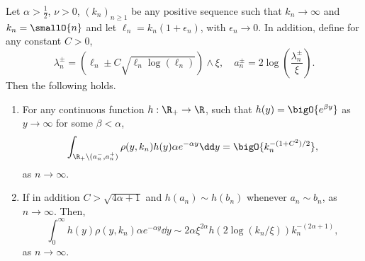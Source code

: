 \begin{lemma}\label{lem:concentration_argument}
Let $\alpha > \frac{1}{2}$, $\nu > 0$, $(k_n)_{n \ge 1}$ be any positive sequence such that $k_n \to \infty$ and $k_n = \smallO{n}$ and let $\ell_n = k_n(1 + \epsilon_n)$, with $\epsilon_n \to 0$. In addition, define for any constant $C > 0$,
\[
	\lambda_n^\pm = (\ell_n \pm C \sqrt{\ell_n \log(\ell_n)}) \wedge \xi, 
	\quad a_n^\pm = 2 \log\left(\frac{\lambda_n^\pm}{\xi}\right).
\] 
Then the following holds.
\begin{enumerate}
\item For any continuous function $h : \R_+ \rightarrow  \R$, such that $h(y) = \bigO{e^{\beta y}}$ as $y \to \infty$ for some $\beta < \alpha$, 
\begin{equation}\label{eq:error_bound_int_rho_not_K}
	\int_{\R_+ \setminus (a_n^-, a_n^+)} \rho(y,k_n) h(y) \alpha e^{-\alpha y} \dd y
	= \bigO{k_n^{-(1+C^2)/2}},
\end{equation}
as $n \to \infty$.
\item If in addition $C > \sqrt{4\alpha + 1}$ and $h(a_n) \sim h(b_n)$ whenever $a_n \sim b_n$, as $n \to \infty$. Then, 
\begin{equation}\label{eq:concentration_h_rho}
	\int_0^\infty h(y) \rho(y,k_n) \alpha e^{-\alpha y} \dd y \sim  
		2\alpha \xi^{2\alpha} h(2\log(k_n/\xi)) k_n^{-(2\alpha + 1)},
\end{equation}
as $n \to \infty$.
\end{enumerate}
\end{lemma}

